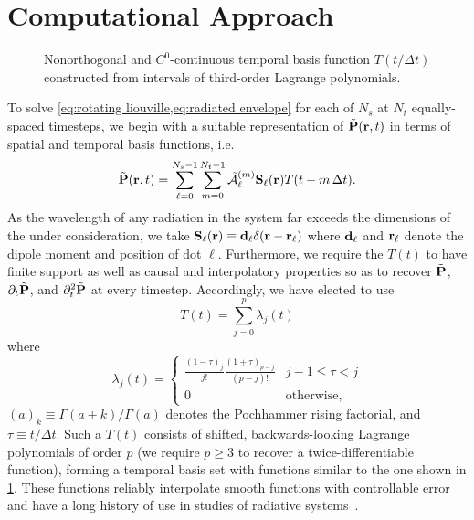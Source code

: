 \section{\label{section:computational approach}Computational Approach}

\begin{figure}
  \centering
  \caption{\label{fig:interpolation basis} Nonorthogonal and $C^0$-continuous temporal basis function $T(t/\Delta t)$ constructed from intervals of third-order Lagrange polynomials.}
\end{figure}
To solve \cref{eq:rotating liouville,eq:radiated envelope} for each of $N_s$ \qds{} at $N_t$ equally-spaced timesteps, we begin with a suitable representation of $\tilde{\vb{P}}(\vb{r}, t)$ in terms of spatial and temporal basis functions, i.e.~
\begin{equation}
  \tilde{\vb{P}}(\vb{r}, t) = \sum_{\ell=0}^{N_s - 1} \sum_{m = 0}^{N_t - 1} \tilde{\mathcal{A}}_{\ell}^{(m)} \vb{S}_\ell(\vb{r}) T(t - m \, \Delta t).
  \label{eq:basis function representation}
\end{equation}
As the wavelength of any radiation in the system far exceeds the dimensions of the \qds{} under consideration, we take $\vb{S}_\ell(\vb{r}) \equiv \vb{d}_\ell \delta(\vb{r} - \vb{r}_\ell)$ where $\vb{d}_\ell$ and $\vb{r}_\ell$ denote the dipole moment and position of dot $\ell$.
Furthermore, we require the $T(t)$ to have finite support as well as causal and interpolatory properties so as to recover $\tilde{\vb{P}}$, $\partial_t \tilde{\vb{P}}$, and $\partial^2_t \tilde{\vb{P}}$ at every timestep.
Accordingly, we have elected to use
\begin{equation}
  T(t) = \sum_{j = 0}^p \lambda_j(t)
  \label{eq:basis sum}
\end{equation}
where
\begin{equation}
  \lambda_j(t) =
  \begin{cases}
    \frac{(1 - \tau)_j}{j!} \frac{(1 + \tau)_{p-j}}{(p-j)!} & j-1 \leqslant \tau < j \\
    0 & \text{otherwise,}
  \end{cases}
  \label{eq:basis piece}
\end{equation}
$(a)_k \equiv \Gamma(a + k)/\Gamma(a)$ denotes the Pochhammer rising factorial, and $\tau \equiv t/\Delta t$.
Such a $T(t)$ consists of shifted, backwards-looking Lagrange polynomials of order $p$ (we require $p \geqslant 3$ to recover a twice-differentiable function), forming a temporal basis set with functions similar to the one shown in \cref{fig:interpolation basis}.
These functions  reliably interpolate smooth functions with controllable error and have a long history of use in studies of radiative systems~\cite{Manara1997,Bluck1997}.

